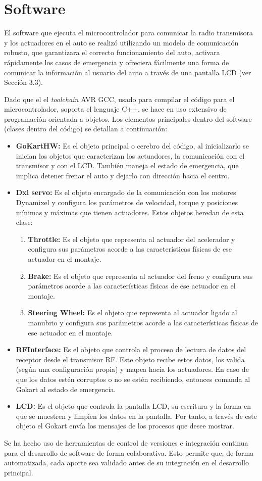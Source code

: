\section{Software}
El software que ejecuta el microcontrolador para comunicar la radio transmisora y los actuadores en el auto se realizó utilizando un modelo de comunicación robusto, que garantizara el correcto funcionamiento del auto, activara rápidamente los casos de emergencia y ofreciera fácilmente una forma de comunicar la información al usuario del auto a través de una pantalla LCD (ver Sección 3.3).

Dado que el el \textit{toolchain} AVR GCC, usado para compilar el código para el microcontrolador, soporta el lenguaje C++, se hace en uso extensivo de programación orientada a objetos. Los elementos principales dentro del software (clases dentro del código) se detallan a continuación:
\begin{itemize}
    \item{\textbf{GoKartHW:}} Es el objeto principal o cerebro del código, al inicializarlo se inician los objetos que caracterizan los actuadores, la comunicación con el transmisor y con el LCD. También maneja el estado de emergencia, que implica detener frenar el auto y dejarlo con dirección hacia el centro.
    \item{\textbf{Dxl servo:}} Es el objeto encargado de la comunicación con los motores Dynamixel y configura los parámetros de velocidad, torque y posiciones mínimas y máximas que tienen actuadores. Estos objetos heredan de esta clase: 
    \begin{enumerate}
        \item{\textbf{Throttle:} Es el objeto que representa al actuador del acelerador y configura sus parámetros acorde a las características físicas de ese actuador en el montaje.}
        \item{\textbf{Brake:} Es el objeto que representa al actuador del freno y configura sus parámetros acorde a las características físicas de ese actuador en el montaje.}
        \item{\textbf{Steering Wheel:} Es el objeto que representa al actuador ligado al manubrio y configura sus parámetros acorde a las características físicas de ese actuador en el montaje.}
    \end{enumerate}
    
    \item{\textbf{RFInterface:} Es el objeto que controla el proceso de lectura de datos del receptor desde el transmisor RF. Este objeto recibe estos datos, los valida (según una configuración propia) y mapea hacia los actuadores. En caso de que los datos estén corruptos o no se estén recibiendo, entonces comanda al Gokart al estado de emergencia.}
    \item{\textbf{LCD:} Es el objeto que controla la pantalla LCD, su escritura y la forma en que se muestren y limpien los datos en la pantalla. Por tanto, a través de este objeto el Gokart envía los mensajes de los procesos que desee mostrar.}
\end{itemize}

Se ha hecho uso de herramientas de control de versiones e integración continua para el desarrollo de software de forma colaborativa. Esto permite que, de forma automatizada, cada aporte sea validado antes de su integración en el desarrollo principal.


